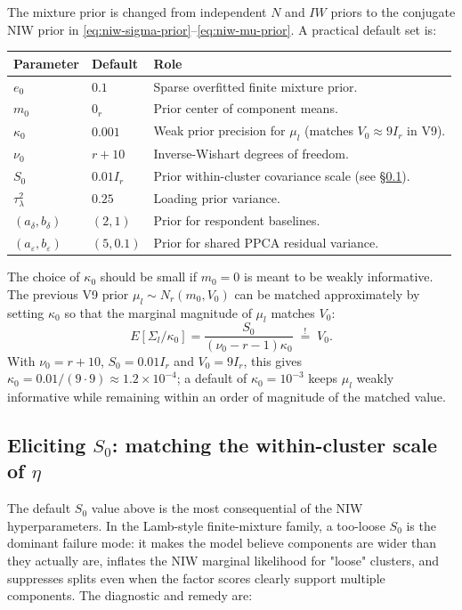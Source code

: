 \documentclass[11pt]{article}
\begin{document}
The mixture prior is changed from independent $N$ and $IW$ priors to the
conjugate NIW prior in \eqref{eq:niw-sigma-prior}--\eqref{eq:niw-mu-prior}.
A practical default set is:
\begin{center}
\begin{tabular}{lll}
\toprule
Parameter & Default & Role \\
\midrule
$e_0$ & $0.1$ & Sparse overfitted finite mixture prior. \\
$m_0$ & $0_r$ & Prior center of component means. \\
$\kappa_0$ & $0.001$ & Weak prior precision for $\mu_l$ (matches $V_0\!\approx\!9I_r$ in V9). \\
$\nu_0$ & $r+10$ & Inverse-Wishart degrees of freedom. \\
$S_0$ & $0.01 I_r$ & Prior within-cluster covariance scale (see \S\ref{sec:s0-elicitation}). \\
$\tau_\lambda^2$ & $0.25$ & Loading prior variance. \\
$(a_\delta,b_\delta)$ & $(2,1)$ & Prior for respondent baselines. \\
$(a_\varepsilon,b_\varepsilon)$ & $(5,0.1)$ & Prior for shared PPCA residual variance. \\
\bottomrule
\end{tabular}
\end{center}

The choice of $\kappa_0$ should be small if $m_0=0$ is meant to be weakly
informative.  The previous V9 prior $\mu_l\sim N_r(m_0,V_0)$ can be matched
approximately by setting $\kappa_0$ so that the marginal magnitude of
$\mu_l$ matches $V_0$:
\[
    E[\Sigma_l/\kappa_0]
    =\frac{S_0}{(\nu_0-r-1)\kappa_0}
    \;\stackrel{!}{=}\;V_0.
\]
With $\nu_0=r+10$, $S_0=0.01I_r$ and $V_0=9I_r$, this gives
$\kappa_0=0.01/(9\cdot 9)\approx 1.2\times 10^{-4}$; a default of
$\kappa_0=10^{-3}$ keeps $\mu_l$ weakly informative while remaining within
an order of magnitude of the matched value.

\subsection{Eliciting $S_0$: matching the within-cluster scale of $\eta$}
\label{sec:s0-elicitation}

The default $S_0$ value above is the most consequential of the NIW
hyperparameters.  In the Lamb-style finite-mixture family, a too-loose
$S_0$ is the dominant failure mode: it makes the model believe components
are wider than they actually are, inflates the NIW marginal likelihood for
"loose" clusters, and suppresses splits even when the factor scores
clearly support multiple components.  The diagnostic and remedy are:
\end{document}
